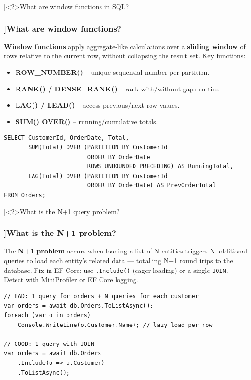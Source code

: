 \QuestionSlide[\CategoryBadge[DbColor!20]{Databases}]<2>{What are window functions in SQL?}

\begin{frame}[fragile]
  \frametitle{\AnswerTitle[\CategoryBadge[DbColor!20]{Databases}]{What are window functions?}}

  {\footnotesize
  \textbf{Window functions} apply aggregate-like calculations over a \textbf{sliding window} of rows relative to the current row, without collapsing the result set. Key functions:
  \begin{itemize}
    \item \textbf{ROW\_NUMBER()} – unique sequential number per partition.
    \item \textbf{RANK() / DENSE\_RANK()} – rank with/without gaps on ties.
    \item \textbf{LAG() / LEAD()} – access previous/next row values.
    \item \textbf{SUM() OVER()} – running/cumulative totals.
  \end{itemize}
  }

  \begin{verbatim}
SELECT CustomerId, OrderDate, Total,
       SUM(Total) OVER (PARTITION BY CustomerId
                        ORDER BY OrderDate
                        ROWS UNBOUNDED PRECEDING) AS RunningTotal,
       LAG(Total) OVER (PARTITION BY CustomerId
                        ORDER BY OrderDate) AS PrevOrderTotal
FROM Orders;
  \end{verbatim}
\end{frame}

\QuestionSlide[\CategoryBadge[DbColor!20]{Databases}]<2>{What is the N+1 query problem?}

\begin{frame}[fragile]
  \frametitle{\AnswerTitle[\CategoryBadge[DbColor!20]{Databases}]{What is the N+1 problem?}}

  {\footnotesize
  The \textbf{N+1 problem} occurs when loading a list of N entities triggers N additional queries to load each entity's related data — totalling N+1 round trips to the database. Fix in EF Core: use \texttt{.Include()} (eager loading) or a single \texttt{JOIN}. Detect with MiniProfiler or EF Core logging.
  }

  \begin{verbatim}
// BAD: 1 query for orders + N queries for each customer
var orders = await db.Orders.ToListAsync();
foreach (var o in orders)
    Console.WriteLine(o.Customer.Name); // lazy load per row

// GOOD: 1 query with JOIN
var orders = await db.Orders
    .Include(o => o.Customer)
    .ToListAsync();
  \end{verbatim}
\end{frame}

